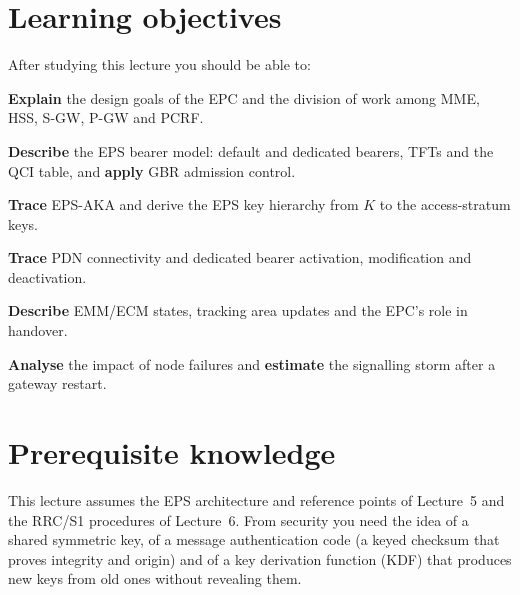 \documentclass[11pt,a4paper]{article}
\begin{document}
\ACNcover

\section{Learning objectives}
After studying this lecture you should be able to:
\begin{objectives}
  \item \textbf{Explain} the design goals of the EPC and the division of work among MME, HSS,
        S-GW, P-GW and PCRF.
  \item \textbf{Describe} the EPS bearer model: default and dedicated bearers, TFTs and the QCI
        table, and \textbf{apply} GBR admission control.
  \item \textbf{Trace} EPS-AKA and derive the EPS key hierarchy from $K$ to the access-stratum keys.
  \item \textbf{Trace} PDN connectivity and dedicated bearer activation, modification and
        deactivation.
  \item \textbf{Describe} EMM/ECM states, tracking area updates and the EPC's role in handover.
  \item \textbf{Analyse} the impact of node failures and \textbf{estimate} the signalling storm after
        a gateway restart.
\end{objectives}

\section{Prerequisite knowledge}
This lecture assumes the EPS architecture and reference points of Lecture~5 and the RRC/S1
procedures of Lecture~6. From security you need the idea of a shared symmetric key, of a message
authentication code (a keyed checksum that proves integrity and origin) and of a key derivation
function (KDF) that produces new keys from old ones without revealing them.
\end{document}
